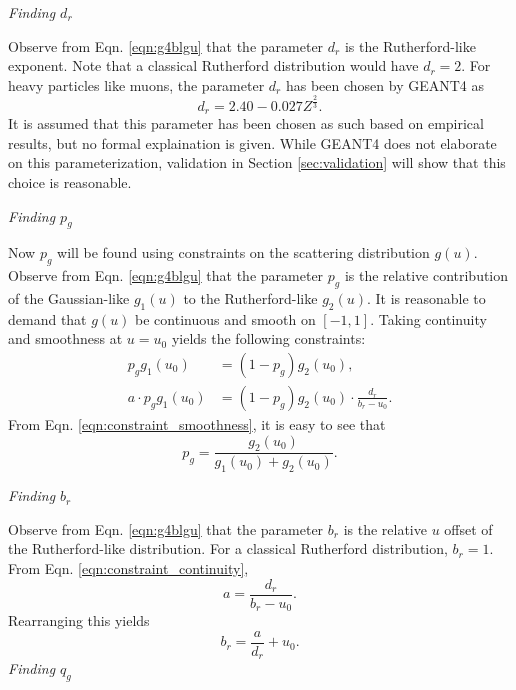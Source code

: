 \noindent \textit{\large{Finding $d_r$}}


Observe from Eqn. \ref{eqn:g4blgu} that the parameter $d_r$ is the Rutherford-like exponent. Note that a classical Rutherford distribution would have $d_r=2$. For heavy particles like muons, the parameter $d_r$ has been chosen by GEANT4 \cite{geant4} as
\begin{equation}
d_r=2.40-0.027Z^{\frac{2}{3}}.
\label{eqn:geantd}
\end{equation}
It is assumed that this parameter has been chosen as such based on empirical results, but no formal explaination is given. While GEANT4 \cite{geant4} does not elaborate on this parameterization, validation in Section \ref{sec:validation} will show that this choice is reasonable.

\noindent \textit{\large{Finding $p_g$}}

Now $p_g$ will be found using constraints on the scattering distribution $g(u)$. Observe from Eqn. \ref{eqn:g4blgu} that the parameter $p_g$ is the relative contribution of the Gaussian-like $g_1(u)$ to the Rutherford-like $g_2(u)$. It is reasonable to demand that $g(u)$ be continuous and smooth on $[-1,1]$. Taking continuity and smoothness at $u=u_0$ yields the following constraints:
%
\begin{align}
p_g g_1(u_0)&=(1-p_g)g_2(u_0), \label{eqn:constraint_smoothness}\\
a\cdot p_g g_1(u_0)&=(1-p_g)g_2(u_0)\cdot\frac{d_r}{b_r-u_0}. \label{eqn:constraint_continuity}
\end{align}
%
From Eqn. \ref{eqn:constraint_smoothness}, it is easy to see that
%
\begin{equation}
p_g=\frac{g_2(u_0)}{g_1(u_0)+g_2(u_0)}.
\label{eqn:geantp}
\end{equation}
%

\noindent \textit{\large{Finding $b_r$}}

Observe from Eqn. \ref{eqn:g4blgu} that the parameter $b_r$ is the relative $u$ offset of the Rutherford-like distribution. For a classical Rutherford distribution, $b_r=1$. From Eqn. \ref{eqn:constraint_continuity},
%
\begin{equation}\nonumber
a=\frac{d_r}{b_r-u_0}.
\end{equation}
%
Rearranging this yields
%
\begin{equation}
b_r=\frac{a}{d_r}+u_0.
\label{eqn:geantb}
\end{equation}
%
\noindent \textit{\large{Finding $q_g$}}

